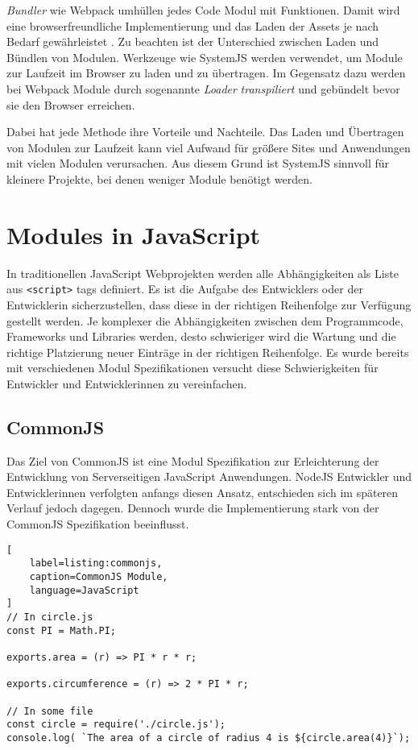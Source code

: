 \textit{Bundler} wie Webpack umhüllen jedes Code Modul mit Funktionen. Damit wird eine browserfreundliche Implementierung und das Laden der Assets je nach Bedarf gewährleistet \autocite{RichHarris}. Zu beachten ist der Unterschied zwischen Laden und Bündlen von Modulen. Werkzeuge wie SystemJS werden verwendet, um Module zur Laufzeit im Browser zu laden und zu übertragen. Im Gegensatz dazu werden bei Webpack Module durch sogenannte \textit{Loader} \textit{transpiliert} und gebündelt bevor sie den Browser erreichen. \autocite{WebpackComparison}

Dabei hat jede Methode ihre Vorteile und Nachteile. Das Laden und Übertragen von Modulen zur Laufzeit kann viel Aufwand für größere Sites und Anwendungen mit vielen Modulen verursachen. Aus diesem Grund ist SystemJS sinnvoll für kleinere Projekte, bei denen weniger Module benötigt werden. \autocite{WebpackComparison}

\section{Modules in JavaScript}
\label{section:modules_in_javaScript}
In traditionellen JavaScript Webprojekten werden alle Abhängigkeiten als Liste aus \lstinline{<script>} tags definiert. Es ist die Aufgabe des Entwicklers oder der Entwicklerin sicherzustellen, dass diese in der richtigen Reihenfolge zur Verfügung gestellt werden. Je komplexer die Abhängigkeiten zwischen dem  Programmcode, Frameworks und Libraries werden, desto schwieriger wird die Wartung und die richtige Platzierung neuer Einträge in der richtigen Reihenfolge. Es wurde bereits mit verschiedenen Modul Spezifikationen versucht diese Schwierigkeiten für Entwickler und Entwicklerinnen zu vereinfachen. \autocite{SebastianPeyrott}

\subsection{CommonJS}
Das Ziel von CommonJS ist eine Modul Spezifikation zur Erleichterung der Entwicklung von Serverseitigen JavaScript Anwendungen. NodeJS Entwickler  und Entwicklerinnen verfolgten anfangs diesen Ansatz, entschieden sich im späteren Verlauf jedoch dagegen. Dennoch wurde die Implementierung stark von der CommonJS Spezifikation beeinflusst. \autocite{SebastianPeyrott}

\begin{lstlisting}[
    label=listing:commonjs,
	caption=CommonJS Module,
	language=JavaScript
]
// In circle.js
const PI = Math.PI;

exports.area = (r) => PI * r * r;

exports.circumference = (r) => 2 * PI * r;

// In some file
const circle = require('./circle.js');
console.log( `The area of a circle of radius 4 is ${circle.area(4)}`);
\end{lstlisting}

